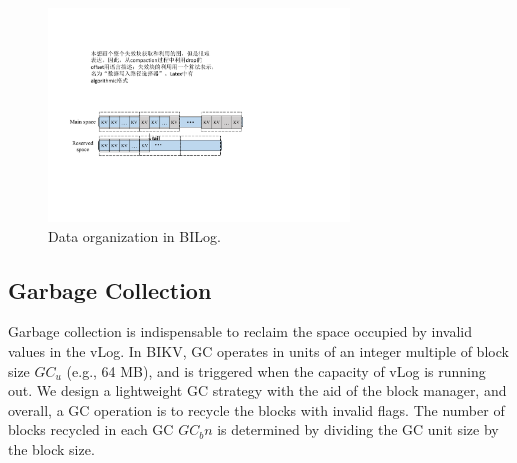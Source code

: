\documentclass[sigconf]{acmart}
\begin{document}
\begin{figure}[!t]
	\setlength{\abovecaptionskip}{0.cm}	
	\setlength{\belowcaptionskip}{-0.cm}
	\centerline{\includegraphics[width=80mm]{vLog.pdf}}
	\caption{Data organization in BILog. {\color{red}{The storage space is divided into blocks (dotted box). The main space is used to store hot data, while the reserved space is used to store cold data. The data is appended to the tail, the filled space performs in-place update.}}}
	\label{fig:ipbrLog}
\end{figure}

\subsection{Garbage Collection} \label{ss3}
Garbage collection is indispensable to reclaim the space occupied by invalid values in the vLog. In BIKV, GC operates in units of an integer multiple of block size $GC_u$ (e.g., 64 MB), and is triggered when the capacity of vLog is running out. We design a lightweight GC strategy with the aid of the block manager, and overall, a GC operation is to recycle the blocks with invalid flags. The number of blocks recycled in each GC $GC_bn$ is determined by dividing the GC unit size by the block size.
\end{document}
